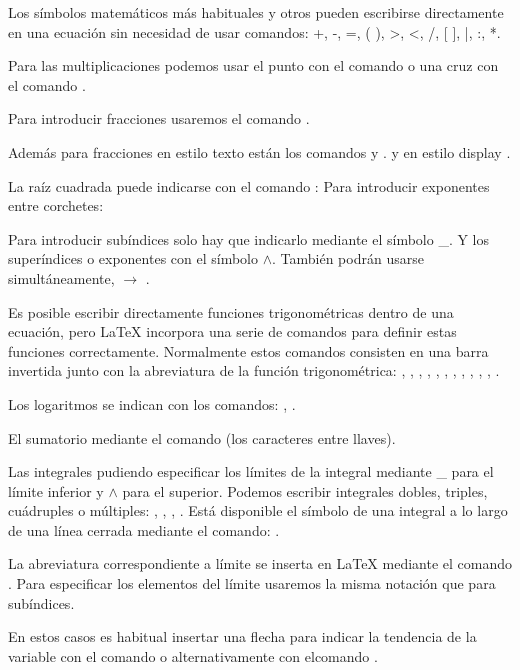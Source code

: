 \documentclass[11pt, a4paper]{article}
\begin{document}
Los símbolos matemáticos más habituales y otros pueden escribirse directamente en una ecuación sin necesidad de usar comandos: +, -, =, ( ), >, <, /, [ ], |, :, *.

Para las multiplicaciones podemos usar el punto con el comando  o una cruz con el comando .

Para introducir fracciones usaremos el comando .

Además para fracciones en estilo texto están los comandos  y .  y en estilo display .

La raíz cuadrada puede indicarse con el comando :  Para introducir exponentes entre corchetes:


Para introducir subíndices solo hay que indicarlo mediante el símbolo \_. Y los superíndices o exponentes con el símbolo $\wedge$. También podrán usarse simultáneamente,  $\to$ . 

Es posible escribir directamente funciones trigonométricas dentro de una ecuación, pero LaTeX incorpora una serie de comandos para definir estas funciones correctamente. Normalmente estos comandos consisten en una barra invertida junto con la abreviatura de la función trigonométrica: , , , , , , , , , , , .

 Los logaritmos se indican con los comandos: , .

El sumatorio mediante el comando  (los caracteres entre llaves).

Las integrales  pudiendo especificar los límites de la integral mediante \_ para el límite inferior y  $\wedge$  para el superior. Podemos escribir integrales dobles, triples, cuádruples o múltiples: , , , . Está disponible el símbolo de una integral a lo largo de una línea cerrada mediante el comando: .

La abreviatura correspondiente a límite se inserta en LaTeX mediante el comando . Para especificar los elementos del límite usaremos la misma notación que para subíndices.

En estos casos es habitual insertar una flecha para indicar la tendencia de la variable con el comando  o alternativamente con elcomando .
\end{document}
